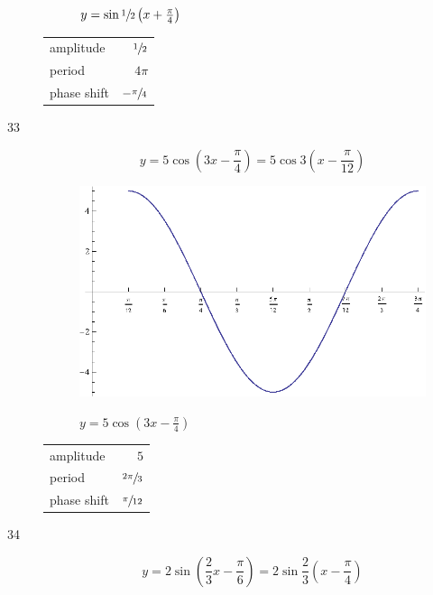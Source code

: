 \documentclass{exam}
\begin{document}
\begin{description}
\begin{figure}[H]
          $y = \sin \sfrac{1}{2} \left( x + \frac{\pi}{4} \right)$
        \end{figure}

        \begin{tabular}[H]{lr}
          \toprule
          amplitude   & $\sfrac{1}{2}$ \\
          period      & $4 \pi$ \\
          phase shift & $- \sfrac{\pi}{4}$ \\
          \bottomrule
        \end{tabular}

      \pagebreak

      \item[33]
        \[
          y = 5 \cos \left( 3x - \frac{\pi}{4} \right) = 5 \cos 3 \left( x - \frac{\pi}{12} \right)
        \]

        \begin{figure}[H]
          \centering
          \includegraphics[scale=0.8]{exercise33.eps}

          $y = 5 \cos \left( 3x - \frac{\pi}{4} \right)$
        \end{figure}

        \begin{tabular}[H]{lr}
          \toprule
          amplitude   & $5$ \\
          period      & $\sfrac{2 \pi}{3}$ \\
          phase shift & $\sfrac{\pi}{12}$ \\
          \bottomrule
        \end{tabular}

      \pagebreak

      \item[34]
        \[
          y = 2 \sin \left( \frac{2}{3} x - \frac{\pi}{6} \right) = 2 \sin \frac{2}{3} \left( x - \frac{\pi}{4} \right)
        \]


\end{description}
\end{document}
